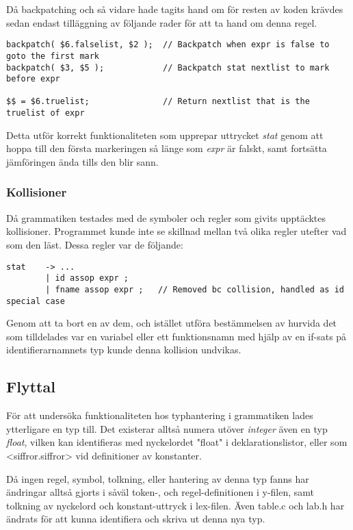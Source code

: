 			Då backpatching och så vidare hade tagits hand om för resten av koden krävdes sedan endast tilläggning av följande rader för att ta hand om denna regel.

\begin{verbatim}
backpatch( $6.falselist, $2 ); 	// Backpatch when expr is false to goto the first mark
backpatch( $3, $5 );			// Backpatch stat nextlist to mark before expr

$$ = $6.truelist;				// Return nextlist that is the truelist of expr
\end{verbatim}

			Detta utför korrekt funktionaliteten som upprepar uttrycket \textit{stat} genom att hoppa till den första markeringen så länge som \textit{expr} är falskt, samt fortsätta jämföringen ända tills den blir sann.

		\subsubsection{Kollisioner}
			Då grammatiken testades med de symboler och regler som givits upptäcktes kollisioner. Programmet kunde inte se skillnad mellan två olika regler utefter vad som den läst. Dessa regler var de följande:
\begin{verbatim}
stat    -> ...
        | id assop expr ;
        | fname assop expr ;   // Removed bc collision, handled as id special case
\end{verbatim}

			Genom att ta bort en av dem, och istället utföra bestämmelsen av hurvida det som tilldelades var en variabel eller ett funktionsnamn med hjälp av en if-sats på identifierarnamnets typ kunde denna kollision undvikas.

	\subsection{Flyttal}
			För att undersöka funktionaliteten hos typhantering i grammatiken lades ytterligare en typ till. Det existerar alltså numera utöver \textit{integer} även en typ \textit{float}, vilken kan identifieras med nyckelordet "float" i deklarationslistor, eller som <siffror.siffror> vid definitioner av konstanter.

			Då ingen regel, symbol, tolkning, eller hantering av denna typ fanns har ändringar alltså gjorts i såväl token-, och regel-definitionen i y-filen, samt tolkning av nyckelord och konstant-uttryck i lex-filen. Även table.c och lab.h har ändrats för att kunna identifiera och skriva ut denna nya typ.


